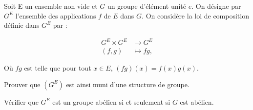 Soit E un ensemble non vide et $G$ un groupe d'élément unité $e$. On désigne par $G^E$ l'ensemble des applications $f$ de $E$ dans $G$.
 On considère la loi de composition définie dans $G^E$ par :

 \begin{align*}
    G^E \times G^E &\rightarrow G^E \\
    (f,g) &\mapsto fg,
 \end{align*}

 Où $fg$ est telle que pour tout $x \in E$, $(fg)(x) = f(x)g(x)$.

 Prouver que $(G^E)$ est ainsi muni d'une structure de groupe.

 Vérifier que $G^E$ est un groupe abélien si et seulement si $G$ est abélien.